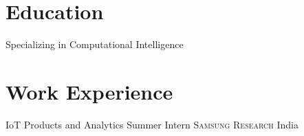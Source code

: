 \documentclass[11pt,a4paper,sans]{moderncv} %
\begin{document}
\section{Education}

{Specializing in Computational Intelligence}




\section{Work Experience}




{IoT Products and Analytics Summer Intern}
{\textsc{Samsung Research}}
{India}
{}
{
}
\end{document}
